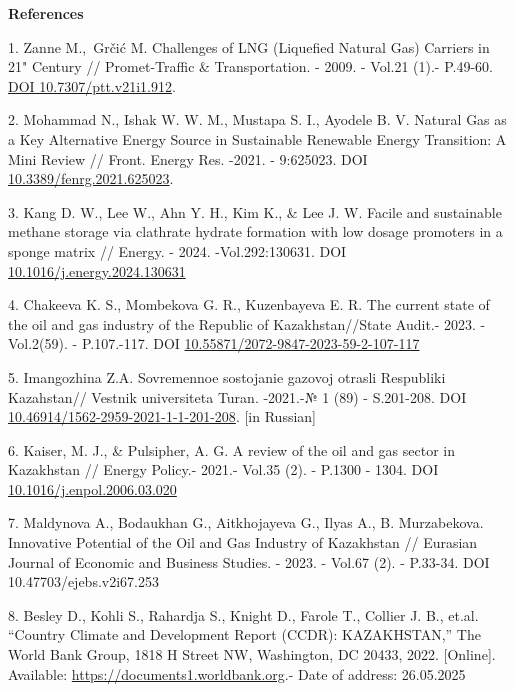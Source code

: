 \begin{center}
{\bfseries References}
\end{center}

\begin{refs}
1. Zanne M.,~Grčić M. Challenges of LNG (Liquefied Natural Gas) Carriers
in 21" Century // Promet-Traffic \& Transportation. - 2009. - Vol.21
(1).- P.49-60. \href{https://doi.org/10.7307/ptt.v21i1.912}{DOI
10.7307/ptt.v21i1.912}.

2. Mohammad N., Ishak W. W. M., Mustapa S. I., Ayodele B. V. Natural Gas
as a Key Alternative Energy Source in Sustainable Renewable Energy
Transition: A Mini Review // Front. Energy Res. -2021. - 9:625023. DOI
\href{https://doi.org/10.3389/fenrg.2021.625023}{10.3389/fenrg.2021.625023}.

3. Kang D. W., Lee W., Ahn Y. H., Kim K., \& Lee J. W. Facile and
sustainable methane storage via clathrate hydrate formation with low
dosage promoters in a sponge matrix // Energy. - 2024. -Vol.292:130631.
DOI
\href{https://doi.org/10.1016/j.energy.2024.130631}{10.1016/j.energy.2024.130631}

4. Chakeeva K. S., Mombekova G. R., Kuzenbayeva E. R. The current state
of the oil and gas industry of the Republic of Kazakhstan//State Audit.-
2023. -Vol.2(59). - P.107.-117. DOI
\href{https://doi.org/10.55871/2072-9847-2023-59-2-107-117}{10.55871/2072-9847-2023-59-2-107-117}

5. Imangozhina Z.A. Sovremennoe sostojanie gazovoj otrasli Respubliki
Kazahstan// Vestnik universiteta Turan. -2021.-№ 1 (89) - S.201-208.
DOI
\href{https://doi.org/10.46914/1562-2959-2021-1-1-201-208}{10.46914/1562-2959-2021-1-1-201-208}.
{[}in Russian{]}

6. Kaiser, M. J., \& Pulsipher, A. G. A review of the oil and gas sector
in Kazakhstan // Energy Policy.- 2021.- Vol.35 (2). - P.1300 - 1304. DOI
\href{http://dx.doi.org/10.1016/j.enpol.2006.03.020}{10.1016/j.enpol.2006.03.020}

7. Maldynova A., Bodaukhan G., Aitkhojayeva G., Ilyas A., B.
Murzabekova. Innovative Potential of the Oil and Gas Industry of
Kazakhstan // Eurasian Journal of Economic and Business Studies. - 2023.
- Vol.67 (2). - P.33-34. DOI 10.47703/ejebs.v2i67.253

8. Besley D., Kohli S., Rahardja S., Knight D., Farole T., Collier J.
B., et.al. ``Country Climate and Development Report (CCDR):
KAZAKHSTAN,'' The World Bank Group, 1818 H Street NW, Washington, DC
20433, 2022. {[}Online{]}. Available:
\href{https://documents1.worldbank.org/curated/en/099420411012246024/pdf/P1773690ad92b401b089700f5be8659ecf0.pdf}{https://documents1.worldbank.org}.-
Date of address: 26.05.2025


\end{refs}
